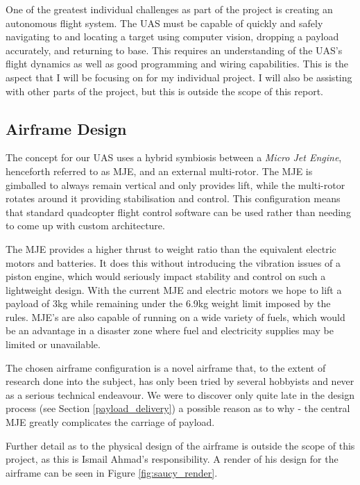 \documentclass[11pt,twoside]{article}
\begin{document}
One of the greatest individual challenges as part of the project is creating an autonomous flight system. The UAS must be capable of quickly and safely navigating to and locating a target using computer vision, dropping a payload accurately, and returning to base. This requires an understanding of the UAS's flight dynamics as well as good programming and wiring capabilities. This is the aspect that I will be focusing on for my individual project. I will also be assisting with other parts of the project, but this is outside the scope of this report.


\subsection{Airframe Design}
The concept for our UAS uses a hybrid symbiosis between a \emph{Micro Jet Engine}, henceforth referred to as MJE, and an external multi-rotor. The MJE is gimballed to always remain vertical and only provides lift, while the multi-rotor rotates around it providing stabilisation and control. This configuration means that standard quadcopter flight control software can be used rather than needing to come up with custom architecture.

The MJE provides a higher thrust to weight ratio than the equivalent electric motors and batteries. It does this without introducing the vibration issues of a piston engine, which would seriously impact stability and control on such a lightweight design. With the current MJE and electric motors we hope to lift a payload of 3kg while remaining under the 6.9kg weight limit imposed by the rules\cite{IMechE_rules}. MJE's are also capable of running on a wide variety of fuels, which would be an advantage in a disaster zone where fuel and electricity supplies may be limited or unavailable\cite{Ismail_paper}.

The chosen airframe configuration is a novel airframe that, to the extent of research done into the subject, has only been tried by several hobbyists and never as a serious technical endeavour. We were to discover only quite late in the design process (see Section \ref{payload_delivery}) a possible reason as to why - the central MJE greatly complicates the carriage of payload.

Further detail as to the physical design of the airframe is outside the scope of this project, as this is Ismail Ahmad's responsibility\cite{Ismail_paper}. A render of his design for the airframe can be seen in Figure \ref{fig:saucy_render}\cite{Ismail_paper}.
\end{document}
